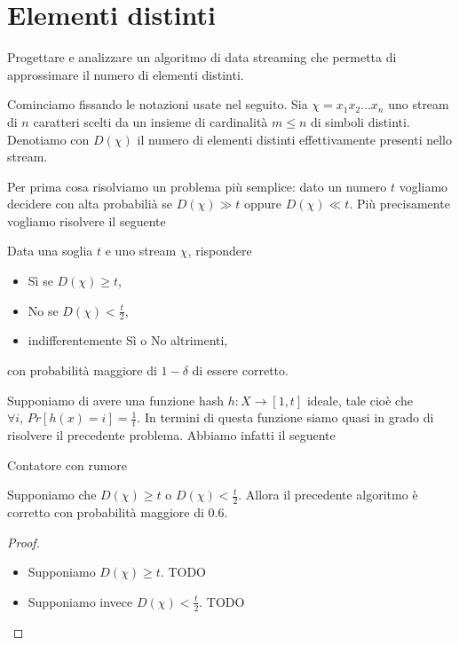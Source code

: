\chapter{Elementi distinti}

\begin{problem*}
    Progettare e analizzare un algoritmo di data streaming che permetta di
    approssimare il numero di elementi distinti.
\end{problem*}

Cominciamo fissando le notazioni usate nel seguito. Sia \(\chi = x_1 x_2
\dots x_n\) uno stream di \(n\) caratteri scelti da un insieme di cardinalit\`a
\(m\le n\) di simboli distinti. Denotiamo con \(D(\chi)\) il numero di elementi
distinti effettivamente presenti nello stream.

Per prima cosa risolviamo un problema pi\`u semplice: dato un numero \(t\)
vogliamo decidere con alta probabili\`a se \(D(\chi) \gg t\) oppure \(D(\chi) \ll
t\). Pi\`u precisamente vogliamo risolvere il seguente
\begin{problem*}
  Data una soglia \(t\) e uno stream \(\chi\), rispondere
  \begin{itemize}
    \item S\`i se \(D(\chi)\ge t\),
    \item No se \(D(\chi)<\frac{t}{2}\),
    \item indifferentemente S\`i o No altrimenti,
  \end{itemize}
  con probabilit\`a maggiore di \(1 - \delta\) di essere corretto.
\end{problem*}

Supponiamo di avere una funzione hash \(h:X\rightarrow [1,t]\) ideale, tale
cio\`e che \(\forall i\mbox{, }Pr[h(x) = i] = \frac{1}{t}\). In termini di
questa funzione siamo quasi in grado di risolvere il precedente problema.
Abbiamo infatti il seguente
\begin{algorithm}
  \caption{Contatore con rumore}
  \begin{algorithmic}[1]
        \State {}
      \EndIf
    \EndFor
    \State {}
  \end{algorithmic}
\end{algorithm}

\begin{lemma}
  Supponiamo che \(D(\chi)\ge t\) o \(D(\chi)<\frac{t}{2}\). Allora il precedente
  algoritmo \`e corretto con probabilit\`a maggiore di \(0.6\).
\end{lemma}
\begin{proof}
  \begin{itemize}
    \item Supponiamo \(D(\chi)\ge t\). TODO
    \item Supponiamo invece \(D(\chi)<\frac{t}{2}\). TODO
  \end{itemize}
\end{proof}

